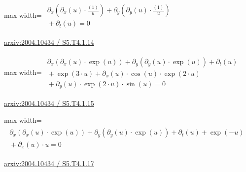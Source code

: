 \documentclass[10pt,a4paper]{article}
\begin{document}
\begin{minipage}{\linewidth}
\begin{center}\begin{adjustbox}{max width=\linewidth}$\displaystyle\begin{gathered}\begin{gathered}\partial_{x}(\partial_{x}(u)\cdot \frac{(1)}{u})+\partial_{y}(\partial_{y}(u)\cdot \frac{(1)}{u})\\[-1pt]{}+\partial_{t}(u)=0\end{gathered}\end{gathered}$\end{adjustbox}\end{center}
{\small \href{https://arxiv.org/html/2004.10434#S5.T4.1.14}{arxiv:2004.10434 / S5.T4.1.14}}\par
\end{minipage}\par\vspace{7mm}

\begin{minipage}{\linewidth}
\begin{center}\begin{adjustbox}{max width=\linewidth}$\displaystyle\begin{gathered}\begin{gathered}\partial_{x}(\partial_{x}(u)\cdot \exp(u))+\partial_{y}(\partial_{y}(u)\cdot \exp(u))+\partial_{t}(u)\\[-1pt]{}+\exp(3\cdot u)+\partial_{x}(u)\cdot \cos(u)\cdot \exp(2\cdot u)\\[-1pt]{}+\partial_{y}(u)\cdot \exp(2\cdot u)\cdot \sin(u)=0\end{gathered}\end{gathered}$\end{adjustbox}\end{center}
{\small \href{https://arxiv.org/html/2004.10434#S5.T4.1.15}{arxiv:2004.10434 / S5.T4.1.15}}\par
\end{minipage}\par\vspace{7mm}

\begin{minipage}{\linewidth}
\begin{center}\begin{adjustbox}{max width=\linewidth}$\displaystyle\begin{gathered}\begin{gathered}\partial_{x}(\partial_{x}(u)\cdot \exp(u))+\partial_{y}(\partial_{y}(u)\cdot \exp(u))+\partial_{t}(u)+\exp(-u)\\[-1pt]{}+\partial_{x}(u)\cdot u=0\end{gathered}\end{gathered}$\end{adjustbox}\end{center}
{\small \href{https://arxiv.org/html/2004.10434#S5.T4.1.17}{arxiv:2004.10434 / S5.T4.1.17}}\par
\end{minipage}\par\vspace{7mm}
\end{document}
